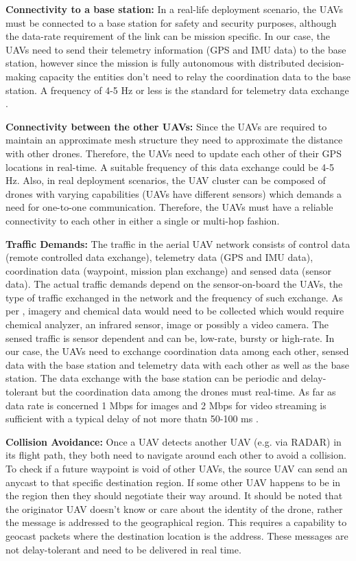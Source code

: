 \textbf{Connectivity to a base station:} In a real-life deployment scenario, the UAVs must be connected to a base station for safety and security purposes, although the data-rate requirement of the link can be mission specific. In our case, the UAVs need to send their telemetry information (GPS and IMU data) to the base station, however since the mission is fully autonomous with distributed decision-making capacity the entities don't need to relay the coordination data to the base station. A frequency of 4-5 Hz or less is the standard for telemetry data exchange \cite{7463007}. 

\textbf{Connectivity between the other UAVs:} Since the UAVs are required to maintain an approximate mesh structure they need to approximate the distance with other drones. Therefore, the UAVs need to update each other of their GPS locations in real-time. A suitable frequency of this data exchange could be 4-5 Hz. Also, in real deployment scenarios, the UAV cluster can be composed of drones with varying capabilities (UAVs have different sensors) which demands a need for one-to-one communication. Therefore, the UAVs must have a reliable connectivity to each other in either a single or multi-hop fashion. 

\textbf{Traffic Demands:} The traffic in the aerial UAV network consists of control data (remote controlled data exchange), telemetry data (GPS and IMU data), coordination data (waypoint, mission plan exchange) and sensed data (sensor data). The actual traffic demands depend on the sensor-on-board the UAVs, the type of traffic exchanged in the network and the frequency of such exchange. As per \cite{NASA_UAV_mission_parameters}, imagery and chemical data would need to be collected which would require chemical analyzer, an infrared sensor, image or possibly a video camera. The sensed traffic is sensor dependent and can be, low-rate, bursty or high-rate. In our case, the UAVs need to exchange coordination data among each other, sensed data with the base station and telemetry data with each other as well as the base station. The data exchange with the base station can be periodic and delay-tolerant but the coordination data among the drones must real-time. As far as data rate is concerned 1 Mbps for images and 2 Mbps for video streaming is sufficient with a typical delay of not more thatn 50-100 ms \cite{7463007}. 

\textbf{Collision Avoidance:} Once a UAV detects another UAV (e.g. via RADAR) in its flight path, they both need to navigate around each other to avoid a collision. To check if a future waypoint is void of other UAVs, the source UAV can send an anycast to that specific destination region. If some other UAV happens to be in the region then they should negotiate their way around. It should be noted that the originator UAV doesn't know or care about the identity of the drone, rather the message is addressed to the geographical region. This requires a capability to geocast packets where the destination location is the address. These messages are not delay-tolerant and need to be delivered in real time.

